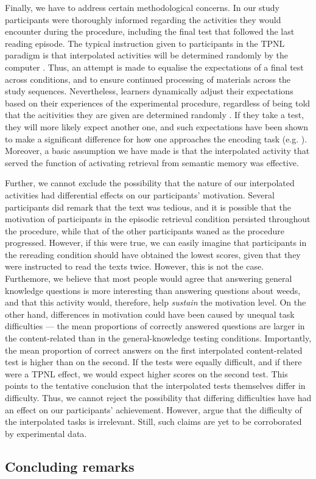 \documentclass[../main.tex]{subfiles}
\begin{document}
Finally, we have to address certain methodological concerns. In our study 
participants were thoroughly informed regarding the activities they would
encounter during the procedure, including the final test that followed the last 
reading episode. The typical instruction given to participants in the TPNL 
paradigm is that interpolated activities will be determined randomly by the 
computer \cite{yangEnhancingLearningRetrieval2018}. Thus, an attempt is made to 
equalise the expectations of a final test across conditions, and to ensure 
continued processing of materials across the study sequences. Nevertheless,
learners dynamically adjust their expectations based on their experiences of 
the experimental procedure, regardless of being told that the acitivities they
are given are determined randomly \citep{weinsteinRoleTestExpectancy2014}. If
they take a test, they will more likely expect another one, and such 
expectations have been shown to make a significant difference for how one 
approaches the encoding task (e.g. 
\citealp{szpunarExpectationFinalCumulative2007}). Moreover, a basic assumption 
we have made is that the interpolated activity that served the function of 
activating retrieval from semantic memory was effective.

Further, we cannot exclude the possibility that the nature of our interpolated
activities had differential effects on our participants' motivation.
Several participants did remark that the text was tedious, and it is possible 
that the motivation of participants in the episodic retrieval condition 
persisted throughout the procedure, while that of the other participants waned 
as the procedure progressed. However, if this were true, we can easily imagine 
that participants in the rereading condition should have obtained the lowest 
scores, given that they were instructed to read the texts twice. However, this 
is not the case. Furthemore, we believe that most people would agree that 
answering general knowledge questions is more interesting than answering 
questions about weeds, and that this activity would, therefore, help 
\textit{sustain} the motivation level. On the other hand, differences in 
motivation could have been caused by unequal task difficulties --- the mean 
proportions of correctly answered questions are larger in the content-related 
than in the general-knowledge testing conditions. Importantly,
the mean proportion of correct answers on the first interpolated 
content-related test is higher than on the second. If the tests were equally 
difficult, and if there were a TPNL effect, we would expect higher scores on 
the second test. This points to the tentative conclusion that the interpolated 
tests themselves differ in difficulty. Thus, we cannot reject the possibility 
that differing difficulties have had an effect on our participants' 
achievement. However, \citet{divisRetrievalSpeedsContext2014} argue that the 
difficulty of the interpolated tasks is irrelevant. Still, such claims are yet 
to be corroborated by experimental data.

\subsection{Concluding remarks}
\end{document}
